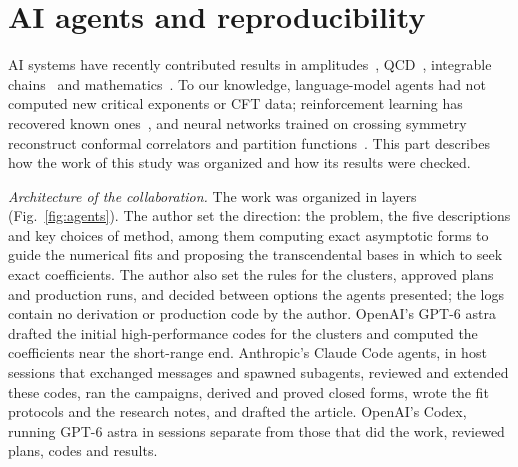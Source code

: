 \documentclass[11pt]{article}
\begin{document}
\section*{AI agents and reproducibility}\label{combined:front:start}

AI systems have recently contributed results in amplitudes~\cite{Guevara:2026qzd,Arkani-Hamed:2026rsz}, QCD~\cite{Schwartz:2026ekw}, integrable chains~\cite{Pozsgay:2026hvh} and mathematics~\cite{Romera-Paredes:2024fs}. To our knowledge, language-model agents had not computed new critical exponents or CFT data; reinforcement learning has recovered known ones~\cite{Kantor:2021kbx,Man:2025rl}, and neural networks trained on crossing symmetry reconstruct conformal correlators and partition functions~\cite{Ghosh:2026xnp,Ghosh:2026efw}. This part describes how the work of this study was organized and how its results were checked.

\textit{Architecture of the collaboration.} The work was organized in layers (Fig.~\ref{fig:agents}). The author set the direction: the problem, the five descriptions and key choices of method, among them computing exact asymptotic forms to guide the numerical fits and proposing the transcendental bases in which to seek exact coefficients. The author also set the rules for the clusters, approved plans and production runs, and decided between options the agents presented; the logs contain no derivation or production code by the author. OpenAI's GPT-6 astra drafted the initial high-performance codes for the clusters and computed the coefficients near the short-range end. Anthropic's Claude Code agents, in host sessions that exchanged messages and spawned subagents, reviewed and extended these codes, ran the campaigns, derived and proved closed forms, wrote the fit protocols and the research notes, and drafted the article. OpenAI's Codex, running GPT-6 astra in sessions separate from those that did the work, reviewed plans, codes and results.


\end{document}
